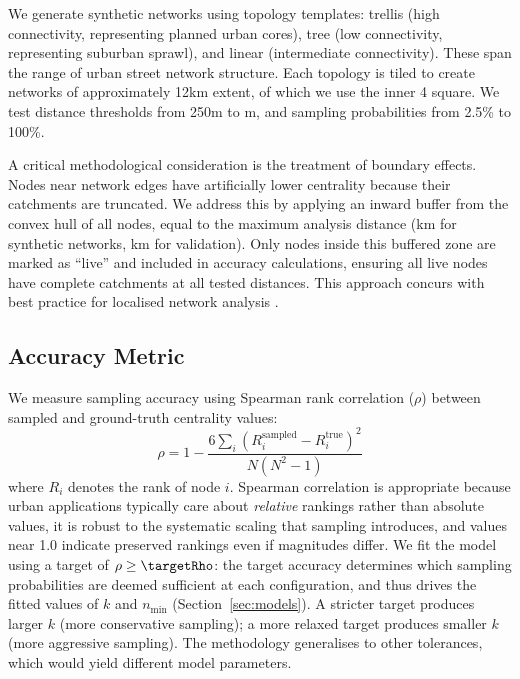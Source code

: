 We generate synthetic networks using \nTopologies{} topology templates: trellis (high connectivity, representing planned urban cores), tree (low connectivity, representing suburban sprawl), and linear (intermediate connectivity). These span the range of urban street network structure. Each topology is tiled to create networks of approximately 12km extent, of which we use the inner 4 square. We test \nDistances{} distance thresholds from 250m to \syntheticMaxDist{}m, and \nProbs{} sampling probabilities from 2.5\% to 100\%.

A critical methodological consideration is the treatment of boundary effects. Nodes near network edges have artificially lower centrality because their catchments are truncated. We address this by applying an inward buffer from the convex hull of all nodes, equal to the maximum analysis distance (\syntheticBuffer{}km for synthetic networks, \glaBuffer{}km for validation). Only nodes inside this buffered zone are marked as ``live'' and included in accuracy calculations, ensuring all live nodes have complete catchments at all tested distances. This approach concurs with best practice for localised network analysis \citep{Gil2017}.

\subsection{Accuracy Metric}

We measure sampling accuracy using Spearman rank correlation ($\rho$) between sampled and ground-truth centrality values:
\begin{equation}
  \rho = 1 - \frac{6 \sum_i (R_i^{\text{sampled}} - R_i^{\text{true}})^2}{N(N^2 - 1)}
\end{equation}
where $R_i$ denotes the rank of node $i$. Spearman correlation is appropriate because urban applications typically care about \emph{relative} rankings rather than absolute values, it is robust to the systematic scaling that sampling introduces, and values near 1.0 indicate preserved rankings even if magnitudes differ. We fit the model using a target of $\rho \geq \targetRho$: the target accuracy determines which sampling probabilities are deemed sufficient at each configuration, and thus drives the fitted values of $k$ and $n_{\min}$ (Section~\ref{sec:models}). A stricter target produces larger $k$ (more conservative sampling); a more relaxed target produces smaller $k$ (more aggressive sampling). The methodology generalises to other tolerances, which would yield different model parameters.

